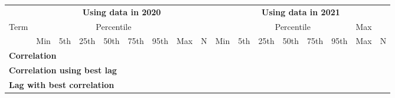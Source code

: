 \begin{tabular}{l llllllll | llllllll} 
\hline 
 & \multicolumn{8}{c|}{{\bf Using data in 2020}} & \multicolumn{8}{c}{{\bf Using data in 2021}} \\ 
Term & & \multicolumn{5}{c}{Percentile} &  &  &  & \multicolumn{5}{c}{Percentile} & Max & \\ 
 & Min & 5th & 25th & 50th & 75th & 95th & Max & N & Min & 5th & 25th & 50th & 75th & 95th & Max & N \\ 
\hline 
\multicolumn{9}{l|}{{\bf Correlation}} & & & & & & & & \\ 
\hline 
\multicolumn{9}{l|}{{\bf Correlation using best lag}} & & & & & & & & \\ 
\hline 
\multicolumn{9}{l|}{{\bf Lag with best correlation}} & & & & & & & & \\ 
\hline 
\end{tabular} 